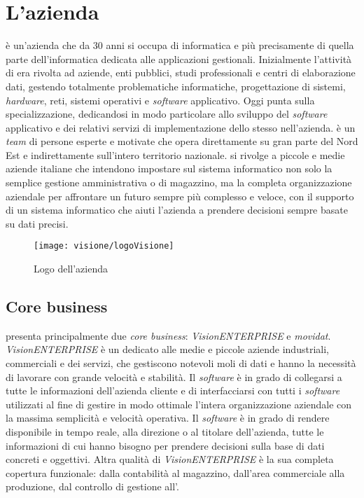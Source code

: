\section{L'azienda}

\visione{} è un'azienda che da 30 anni si occupa di informatica e più precisamente di quella parte dell'informatica dedicata alle applicazioni gestionali. Inizialmente l'attività di \visione{} era rivolta ad aziende, enti pubblici, studi professionali e centri di elaborazione dati, gestendo totalmente problematiche informatiche, progettazione di sistemi, \textit{hardware}, reti, sistemi operativi e \textit{software} applicativo. Oggi \visione{} punta sulla specializzazione, dedicandosi in modo particolare allo sviluppo del \textit{software} applicativo e dei relativi servizi di implementazione dello stesso nell'azienda. \visione{} è un \textit{team} di persone esperte e motivate che opera direttamente su gran parte del Nord Est e indirettamente sull'intero territorio nazionale. \visione{} si rivolge a piccole e medie aziende italiane che intendono impostare sul sistema informatico non solo la semplice gestione amministrativa o di magazzino, ma la completa organizzazione aziendale per affrontare un futuro sempre più complesso e veloce, con il supporto di un sistema informatico che aiuti l'azienda a prendere decisioni sempre basate su dati precisi.

\begin{figure}[!h] 
    \centering 
    \texttt{[image: visione/logoVisione]} 
    \caption{Logo dell'azienda \visione{}}
\end{figure}

\subsection{Core business}

\visione{} presenta principalmente due \textit{core business}: \textit{VisionENTERPRISE} e \textit{movidat}. \textit{VisionENTERPRISE} è un   dedicato alle medie e piccole aziende industriali, commerciali e dei servizi, che gestiscono notevoli moli di dati e hanno la necessità di lavorare con grande velocità e stabilità. Il \textit{software} è in grado di collegarsi a tutte le informazioni dell'azienda cliente e di interfacciarsi con tutti i \textit{software} utilizzati al fine di gestire in modo ottimale l'intera organizzazione aziendale con la massima semplicità e velocità operativa. Il \textit{software} è in grado di rendere disponibile in tempo reale, alla direzione o al titolare dell'azienda, tutte le informazioni di cui hanno bisogno per prendere decisioni sulla base di dati concreti e oggettivi. Altra qualità di \textit{VisionENTERPRISE} è la sua completa copertura funzionale: dalla contabilità al magazzino, dall'area commerciale alla produzione, dal controllo di gestione all'.

